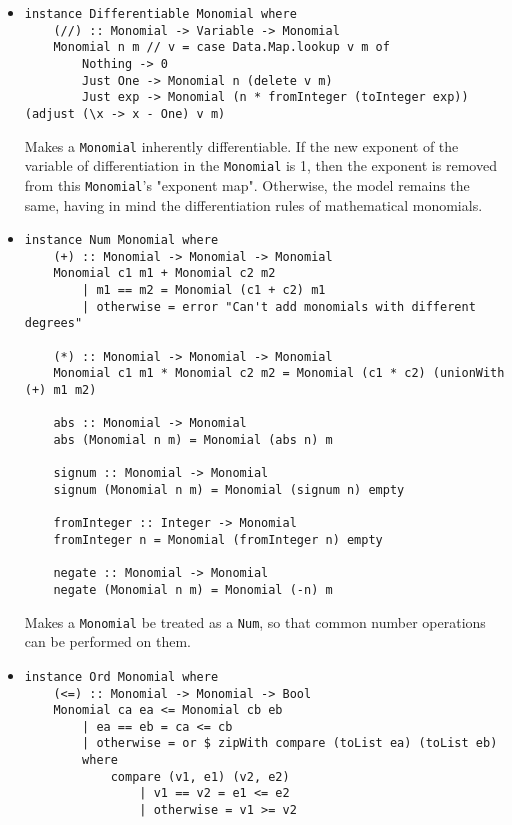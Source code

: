 \documentclass[11pt,a4paper]{article}
\begin{document}
\begin{itemize}
    \item \begin{lstlisting}
instance Differentiable Monomial where
    (//) :: Monomial -> Variable -> Monomial
    Monomial n m // v = case Data.Map.lookup v m of
        Nothing -> 0
        Just One -> Monomial n (delete v m)
        Just exp -> Monomial (n * fromInteger (toInteger exp)) (adjust (\x -> x - One) v m)      
    \end{lstlisting}

          Makes a \lstinline{Monomial} inherently differentiable. If the new exponent of the variable of differentiation in the \lstinline{Monomial} is 1, then the exponent is removed from this \lstinline{Monomial}'s "exponent map". Otherwise, the model remains the same, having in mind the differentiation rules of mathematical monomials.

    \item \begin{lstlisting}
instance Num Monomial where
    (+) :: Monomial -> Monomial -> Monomial
    Monomial c1 m1 + Monomial c2 m2
        | m1 == m2 = Monomial (c1 + c2) m1
        | otherwise = error "Can't add monomials with different degrees"
    
    (*) :: Monomial -> Monomial -> Monomial
    Monomial c1 m1 * Monomial c2 m2 = Monomial (c1 * c2) (unionWith (+) m1 m2)
    
    abs :: Monomial -> Monomial
    abs (Monomial n m) = Monomial (abs n) m
    
    signum :: Monomial -> Monomial
    signum (Monomial n m) = Monomial (signum n) empty
    
    fromInteger :: Integer -> Monomial
    fromInteger n = Monomial (fromInteger n) empty
    
    negate :: Monomial -> Monomial
    negate (Monomial n m) = Monomial (-n) m
    \end{lstlisting}

          Makes a \lstinline{Monomial} be treated as a \lstinline{Num}, so that common number operations can be performed on them.

    \item \begin{lstlisting}
instance Ord Monomial where
    (<=) :: Monomial -> Monomial -> Bool
    Monomial ca ea <= Monomial cb eb
        | ea == eb = ca <= cb
        | otherwise = or $ zipWith compare (toList ea) (toList eb)
        where
            compare (v1, e1) (v2, e2)
                | v1 == v2 = e1 <= e2
                | otherwise = v1 >= v2
    \end{lstlisting}


\end{itemize}
\end{document}
